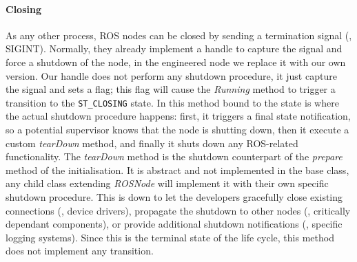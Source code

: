 \paragraph{Closing} As any other process, ROS nodes can be closed by sending a termination signal (\ie, SIGINT). Normally, they already implement a handle to capture the signal and force a shutdown of the node, in the engineered node we replace it with our own version. Our handle does not perform any shutdown procedure, it just capture the signal and sets a flag; this flag will cause the \textit{Running} method to trigger a transition to the \texttt{ST\_CLOSING} state.  In this method bound to the state is where the actual shutdown procedure happens: first, it triggers a final state notification, so a potential supervisor knows that the node is shutting down, then it execute a custom \textit{tearDown} method, and finally it shuts down any ROS-related functionality. The \textit{tearDown} method is the shutdown counterpart of the \textit{prepare} method of the initialisation. It is abstract and not implemented in the base class, any child class extending \textit{ROSNode} will implement it with their own specific shutdown procedure. This is down to let the developers gracefully close existing connections (\eg, device drivers), propagate the shutdown to other nodes (\eg, critically dependant components), or provide additional shutdown notifications (\eg, specific logging systems). Since this is the terminal state of the life cycle, this method does not implement any transition.

